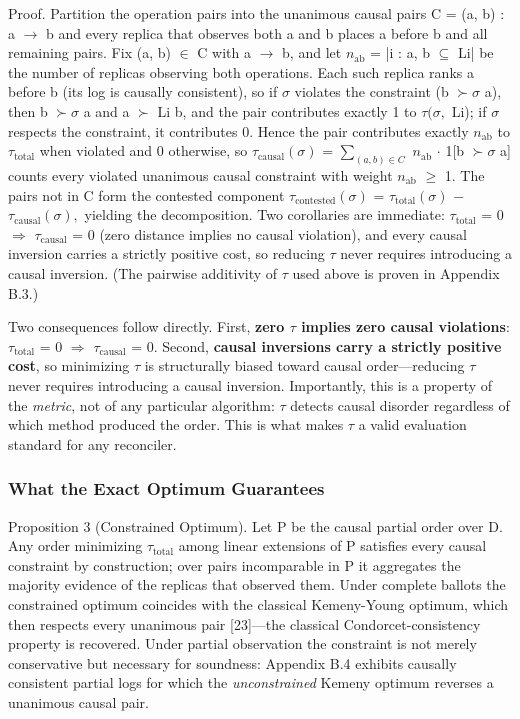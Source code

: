\documentclass[10pt,twocolumn]{article}
\begin{document}
Proof. Partition the operation pairs into the unanimous causal pairs C = {(a, b) : a $\rightarrow$ b and every replica that observes both a and b places a before b} and all remaining pairs. Fix (a, b) $\in$ C with a $\rightarrow$ b, and let $n_{\mathrm{ab}}$ = |{i : {a, b} $\subseteq$ Li}| be the number of replicas observing both operations. Each such replica ranks a before b (its log is causally consistent), so if $\sigma$ violates the constraint (b $\succ\sigma$ a), then b $\succ\sigma$ a and a $\succ$ Li b, and the pair contributes exactly 1 to $\tau(\sigma,$ Li); if $\sigma$ respects the constraint, it contributes 0. Hence the pair contributes exactly $n_{\mathrm{ab}}$ to $\tau_{\mathrm{total}}$ when violated and 0 otherwise, so $\tau_{\mathrm{causal}}(\sigma)$ = $\sum_{(a,b)\in C}$ $n_{\mathrm{ab}}$ $\cdot$ 1[b $\succ\sigma$ a] counts every violated unanimous causal constraint with weight $n_{\mathrm{ab}}$ $\geq$ 1. The pairs not in C form the contested component $\tau_{\mathrm{contested}}(\sigma)$ = $\tau_{\mathrm{total}}(\sigma)$ $-$ $\tau_{\mathrm{causal}}(\sigma),$ yielding the decomposition. Two corollaries are immediate: $\tau_{\mathrm{total}}$ = 0 $\Rightarrow$ $\tau_{\mathrm{causal}}$ = 0 (zero distance implies no causal violation), and every causal inversion carries a strictly positive cost, so reducing $\tau$ never requires introducing a causal inversion. (The pairwise additivity of $\tau$ used above is proven in Appendix B.3.)

Two consequences follow directly. First, \textbf{zero $\tau$ implies zero causal violations}: $\tau_{\mathrm{total}}$ = 0 $\Rightarrow$ $\tau_{\mathrm{causal}}$ = 0. Second, \textbf{causal inversions carry a strictly positive cost}, so minimizing $\tau$ is structurally biased toward causal order—reducing $\tau$ never requires introducing a causal inversion. Importantly, this is a property of the \emph{metric}, not of any particular algorithm: $\tau$ detects causal disorder regardless of which method produced the order. This is what makes $\tau$ a valid evaluation standard for any reconciler.

\subsubsection{What the Exact Optimum Guarantees}
Proposition 3 (Constrained Optimum). Let P be the causal partial order over D. Any order minimizing $\tau_{\mathrm{total}}$ among linear extensions of P satisfies every causal constraint by construction; over pairs incomparable in P it aggregates the majority evidence of the replicas that observed them. Under complete ballots the constrained optimum coincides with the classical Kemeny-Young optimum, which then respects every unanimous pair [23]—the classical Condorcet-consistency property is recovered. Under partial observation the constraint is not merely conservative but necessary for soundness: Appendix B.4 exhibits causally consistent partial logs for which the \emph{unconstrained} Kemeny optimum reverses a unanimous causal pair.
\end{document}
